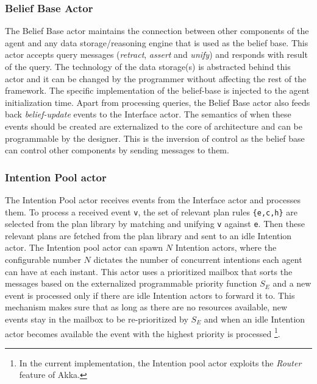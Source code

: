 \subsubsection{Belief Base Actor}
The Belief Base actor maintains the connection between other components of the agent and any data storage/reasoning engine that is used as the belief base. This actor accepts query messages (\textit{retract}, 
\textit{assert} and \textit{unify}) and responds with result of the query. The technology of the data storage(s) is abstracted behind this actor and it can be changed by the programmer without affecting the rest of the framework. The specific implementation of the belief-base is injected to the agent initialization time. %
Apart from processing queries, the Belief Base actor also feeds back \textit{belief-update} events to the Interface actor. The semantics of when these events should be created are externalized to the core of architecture and can be programmable by the designer. This is the inversion of control as the belief base can control other components by sending messages to them.

\subsubsection{Intention Pool actor}
The Intention Pool actor receives events from the Interface actor and processes them. To process a received event \verb+v+, the set of relevant plan rules \verb+{e,c,h}+ are selected from the plan library by matching and unifying \verb+v+ against \verb+e+. Then these relevant plans are fetched from the plan library and sent to an idle Intention actor. The Intention pool actor can spawn $N$ Intention actors, where the configurable number $N$ dictates the number of concurrent intentions each agent can have at each instant. This actor uses a prioritized mailbox that sorts the messages based on the externalized programmable priority function $S_E$ and a new event is processed only if there are idle Intention actors to forward it to. This mechanism makes sure that as long as there are no resources available, new events stay in the mailbox to be re-prioritized by $S_E$ and when an idle Intention actor becomes available the event with the highest priority is processed \footnote{In the current implementation, the Intention pool actor exploits the \textit{Router} feature of Akka.}. %

